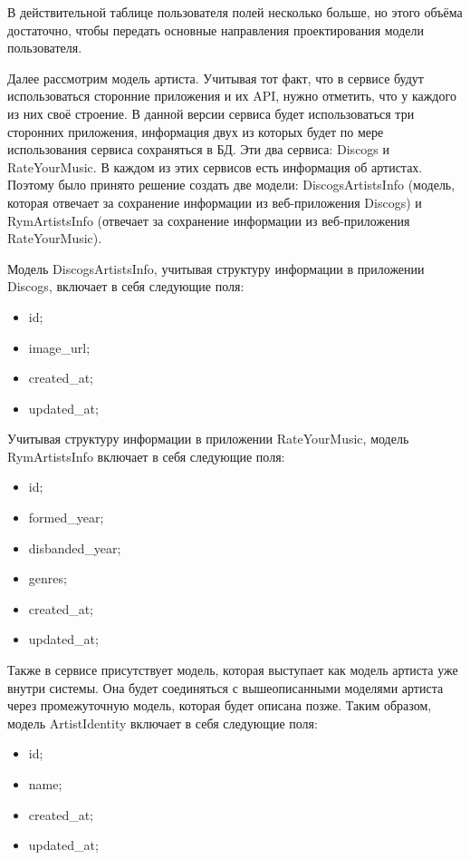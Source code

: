 В действительной таблице пользователя полей несколько больше, но этого объёма достаточно, чтобы передать основные направления проектирования модели пользователя.

Далее рассмотрим модель артиста. Учитывая тот факт, что в сервисе будут использоваться сторонние приложения и их API, нужно отметить, что у каждого из них своё строение. В данной версии сервиса будет использоваться три сторонних приложения, информация двух из которых будет по мере использования сервиса сохраняться в БД. Эти два сервиса: Discogs и RateYourMusic. В каждом из этих сервисов есть информация об артистах. Поэтому было принято решение создать две модели: DiscogsArtistsInfo (модель, которая отвечает за сохранение информации из веб-приложения Discogs) и RymArtistsInfo (отвечает за сохранение информации из веб-приложения RateYourMusic).

Модель DiscogsArtistsInfo, учитывая структуру информации в приложении Discogs, включает в себя следующие поля:

\begin{itemize}
  \item id;
  \item image\_url;
  \item created\_at;
  \item updated\_at;
\end{itemize}

Учитывая структуру информации в приложении RateYourMusic, модель RymArtistsInfo включает в себя следующие поля:

\begin{itemize}
  \item id;
  \item formed\_year;
  \item disbanded\_year;
  \item genres;
  \item created\_at;
  \item updated\_at;
\end{itemize}

Также в сервисе присутствует модель, которая выступает как модель артиста уже внутри системы. Она будет соединяться с вышеописанными моделями артиста через промежуточную модель, которая будет описана позже. Таким образом, модель ArtistIdentity включает в себя следующие поля:

\begin{itemize}
  \item id;
  \item name;
  \item created\_at;
  \item updated\_at;
\end{itemize}

